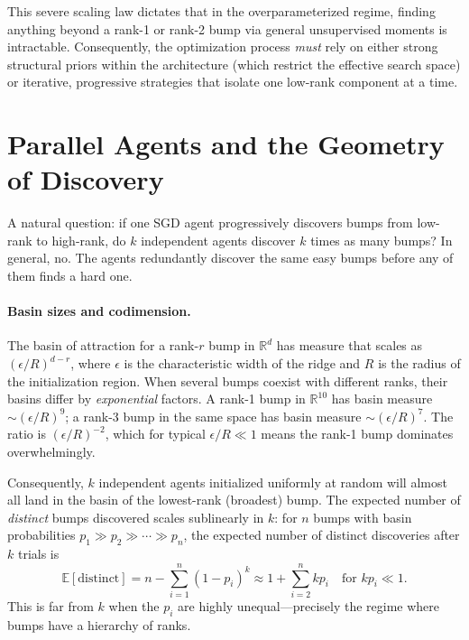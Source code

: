\documentclass{article}
\begin{document}
This severe scaling law dictates that in the overparameterized regime, finding
anything beyond a rank-1 or rank-2 bump via general unsupervised moments is
intractable. Consequently, the optimization process \emph{must} rely on either
strong structural priors within the architecture (which restrict the effective
search space) or iterative, progressive strategies that isolate one low-rank
component at a time.

\section{Parallel Agents and the Geometry of Discovery}
\label{sec:parallel}

A natural question: if one SGD agent progressively discovers bumps from
low-rank to high-rank, do $k$ independent agents discover $k$ times as
many bumps?  In general, no.  The agents redundantly discover the same
easy bumps before any of them finds a hard one.

\paragraph{Basin sizes and codimension.}
The basin of attraction for a rank-$r$ bump in $\mathbb{R}^d$ has
measure that scales as $(\epsilon/R)^{d-r}$, where $\epsilon$ is the
characteristic width of the ridge and $R$ is the radius of the
initialization region.  When several bumps coexist with different ranks,
their basins differ by \emph{exponential} factors.  A rank-1 bump in
$\mathbb{R}^{10}$ has basin measure $\sim (\epsilon/R)^9$; a rank-3
bump in the same space has basin measure $\sim (\epsilon/R)^7$.  The
ratio is $(\epsilon/R)^{-2}$, which for typical $\epsilon/R \ll 1$
means the rank-1 bump dominates overwhelmingly.

Consequently, $k$ independent agents initialized uniformly at random
will almost all land in the basin of the lowest-rank (broadest) bump.
The expected number of \emph{distinct} bumps discovered scales
sublinearly in $k$: for $n$ bumps with basin probabilities $p_1 \gg
p_2 \gg \cdots \gg p_n$, the expected number of distinct discoveries
after $k$ trials is
\begin{equation}
  \mathbb{E}[\text{distinct}] = n - \sum_{i=1}^{n} (1 - p_i)^k
  \approx 1 + \sum_{i=2}^{n} k p_i \quad \text{for } k p_i \ll 1.
  \label{eq:coupon}
\end{equation}
This is far from $k$ when the $p_i$ are highly unequal---precisely the
regime where bumps have a hierarchy of ranks.
\end{document}
